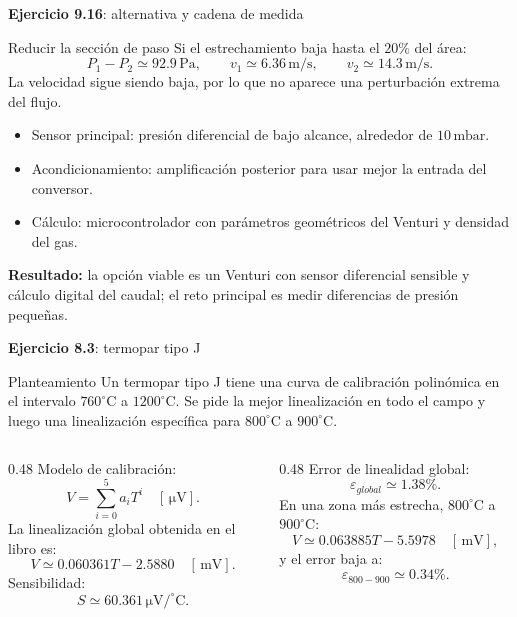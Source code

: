\documentclass[aspectratio=169,9pt]{beamer}
\newcommand{\exercise}[1]{\textbf{Ejercicio #1}}
\newcommand{\result}[1]{\textbf{\color{eiTeal}Resultado:} #1}
\newcommand{\unit}[1]{\,\mathrm{#1}}
\begin{document}
\begin{frame}{\exercise{9.16}: alternativa y cadena de medida}
  \begin{block}{Reducir la sección de paso}
    Si el estrechamiento baja hasta el \(20\%\) del área:
    \[
      P_1-P_2\simeq92.9\unit{Pa},
      \qquad
      v_1\simeq6.36\unit{m/s},
      \qquad
      v_2\simeq14.3\unit{m/s}.
    \]
    La velocidad sigue siendo baja, por lo que no aparece una perturbación extrema del flujo.
  \end{block}

  \begin{itemize}
    \item Sensor principal: presión diferencial de bajo alcance, alrededor de \(10\unit{mbar}\).
    \item Acondicionamiento: amplificación posterior para usar mejor la entrada del conversor.
    \item Cálculo: microcontrolador con parámetros geométricos del Venturi y densidad del gas.
  \end{itemize}

  \result{la opción viable es un Venturi con sensor diferencial sensible y cálculo digital del caudal; el reto principal es medir diferencias de presión pequeñas.}
\end{frame}

\begin{frame}{\exercise{8.3}: termopar tipo J}
  \begin{block}{Planteamiento}
    Un termopar tipo J tiene una curva de calibración polinómica en el intervalo \(760^\circ\mathrm{C}\) a \(1200^\circ\mathrm{C}\). Se pide la mejor linealización en todo el campo y luego una linealización específica para \(800^\circ\mathrm{C}\) a \(900^\circ\mathrm{C}\).
  \end{block}

  \begin{columns}[T,onlytextwidth]
    \begin{column}{0.48\textwidth}
      Modelo de calibración:
      \[
        V=\sum_{i=0}^{5}a_iT^i\quad [\unit{\mu V}].
      \]
      La linealización global obtenida en el libro es:
      \[
        V\simeq0.060361T-2.5880\quad [\unit{mV}].
      \]
      Sensibilidad:
      \[
        S\simeq60.361\unit{\mu V/^\circ C}.
      \]
    \end{column}
    \begin{column}{0.48\textwidth}
      Error de linealidad global:
      \[
        \varepsilon_{global}\simeq1.38\%.
      \]
      En una zona más estrecha, \(800^\circ\mathrm{C}\) a \(900^\circ\mathrm{C}\):
      \[
        V\simeq0.063885T-5.5978\quad [\unit{mV}],
      \]
      y el error baja a:
      \[
        \varepsilon_{800-900}\simeq0.34\%.
      \]
    \end{column}
  \end{columns}
\end{frame}
\end{document}
